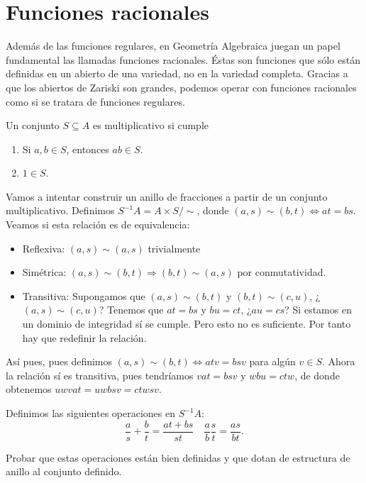 \documentclass[ACGA.tex]{subfiles}
\begin{document}
\section{Funciones racionales}

Además de las funciones regulares, en Geometría Algebraica juegan un papel fundamental las llamadas funciones racionales. Éstas son funciones que sólo están definidas en un abierto de una variedad, no en la variedad completa. Gracias a que los abiertos de Zariski son grandes, podemos operar con funciones racionales como si se tratara de funciones regulares.

\begin{defi}
Un conjunto $S\subseteq A$ es multiplicativo si cumple
\begin{enumerate}
\item Si $a,b\in S$, entonces $ab\in S$.
\item $1\in S$.
\end{enumerate}
\end{defi}

Vamos a intentar construir un anillo de fracciones a partir de un conjunto multiplicativo. Definimos $S^{-1}A=A\times S/\sim$, donde $(a,s)\sim (b,t)\Leftrightarrow at=bs$. Veamos si esta relación es de equivalencia:
\begin{itemize}
\item Reflexiva: $(a,s)\sim (a,s)$ trivialmente
\item Simétrica: $(a,s)\sim (b,t)\Rightarrow (b,t)\sim (a,s)$ por conmutatividad.
\item Transitiva: Supongamos que $(a,s)\sim (b,t)$ y $(b,t)\sim (c,u)$, ¿$(a,s)\sim (c,u)$? Tenemos que $at=bs$ y $bu=ct$, ¿$au=cs$? Si estamos en un dominio de integridad sí se cumple. Pero esto no es suficiente. Por tanto hay que redefinir la relación.
\end{itemize}

Así pues, pues definimos $(a,s)\sim (b,t)\Leftrightarrow atv=bsv$ para algún $v\in S$. Ahora la relación sí es transitiva, pues tendríamos $vat=bsv$ y $wbu=ctw$, de donde obtenemos $uwvat=uwbsv=ctwsv$. 

Definimos las siguientes operaciones en $S^{-1}A$:
$$\frac{a}{s}+\frac{b}{t}=\frac{at+bs}{st}\quad \frac{a}{b}\frac{s}{t}=\frac{as}{bt}.$$

\begin{ejer}
Probar que estas operaciones están bien definidas y que dotan de estructura de anillo al conjunto definido.
\end{ejer}
\end{document}
